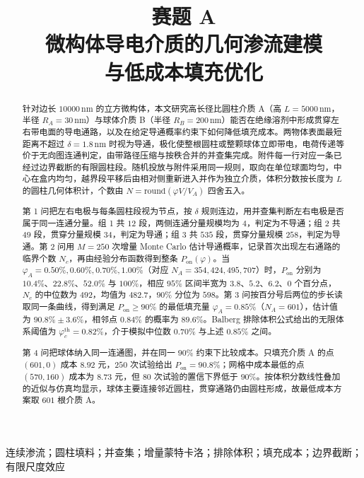 \documentclass[UTF8,a4paper,zihao=-4,fontset=none]{ctexart}
\title{\heiti\zihao{-4} 赛题 A\\[8pt]
\heiti\zihao{3} 微构体导电介质的几何渗流建模\\[-2pt]与低成本填充优化}
\author{}
\date{}
\providecommand{\kaishu}{}
\providecommand{\heiti}{}
\renewcommand{\kaishu}{\CJKfamily{zhkai}}
\renewcommand{\heiti}{\CJKfamily{zhhei}}
\begin{document}
\maketitle
\thispagestyle{empty}

\begin{abstract}
\kaishu
针对边长 $10000\,\mathrm{nm}$ 的立方微构体，本文研究高长径比圆柱介质 A（高 $L=5000\,\mathrm{nm}$，半径 $R_A=30\,\mathrm{nm}$）与球体介质 B（半径 $R_B=200\,\mathrm{nm}$）能否在绝缘溶剂中形成贯穿左右带电面的导电通路，以及在给定导通概率约束下如何降低填充成本。两物体表面最短距离不超过 $\delta=1.8\,\mathrm{nm}$ 时视为导通，极化使整根圆柱或整颗球体立即带电，电荷传递等价于无向图连通判定，由带路径压缩与按秩合并的并查集完成。附件每一行对应一条已经过边界截断的有限圆柱段。随机投放与附件采用同一规则，取向在单位球面均匀，中心在盒内均匀，越界段平移后由相对侧重新进入并作为独立介质，体积分数按长度为 $L$ 的圆柱几何体积计，个数由 $N=\mathrm{round}(\varphi V/V_A)$ 四舍五入。

第 1 问把左右电极与每条圆柱段视为节点，按 $\delta$ 规则连边，用并查集判断左右电极是否属于同一连通分量。组 1 共 $12$ 段，两侧连通分量规模均为 $4$，判定为不导通；组 2 共 $49$ 段，贯穿分量规模 $34$，判定为导通；组 3 共 $535$ 段，贯穿分量规模 $258$，判定为导通。第 2 问用 $M=250$ 次增量 Monte Carlo 估计导通概率，记录首次出现左右通路的临界个数 $N_c$，再由经验分布函数得到整条 $P_{\mathrm{on}}(\varphi)$。当 $\varphi_A=0.50\%,0.60\%,0.70\%,1.00\%$（对应 $N_A=354,424,495,707$）时，$P_{\mathrm{on}}$ 分别为 $10.4\%$、$22.8\%$、$52.0\%$ 与 $100\%$，相应 $95\%$ 区间半宽为 $3.8$、$5.2$、$6.2$、$0$ 个百分点，$N_c$ 的中位数为 $492$，均值为 $482.7$，$90\%$ 分位为 $598$。第 3 问按百分号后两位的步长读取同一条曲线，得到满足 $P_{\mathrm{on}}\ge 90\%$ 的最低填充量 $\varphi_A=0.85\%$（$N_A=601$），估计值为 $90.8\%\pm 3.6\%$，相邻点 $0.84\%$ 的概率为 $89.6\%$。Balberg 排除体积公式给出的无限体系阈值为 $\varphi_c^{\mathrm{th}}=0.82\%$，介于模拟中位数 $0.70\%$ 与上述 $0.85\%$ 之间。

第 4 问把球体纳入同一连通图，并在同一 $90\%$ 约束下比较成本。只填充介质 A 的点 $(601,0)$ 成本 $8.92$ 元，$250$ 次试验给出 $P_{\mathrm{on}}=90.8\%$；网格中成本最低的点 $(570,160)$ 成本为 $8.73$ 元，但 $80$ 次试验的置信下界低于 $90\%$。按体积分数线性叠加的近似与仿真均显示，球体主要连接邻近圆柱，贯穿通路仍由圆柱形成，故最低成本方案取 $601$ 根介质 A。
\end{abstract}

\medskip
\noindent{\heiti 关键词}\quad 连续渗流；圆柱填料；并查集；增量蒙特卡洛；排除体积；填充成本；边界截断；有限尺度效应
\end{document}
